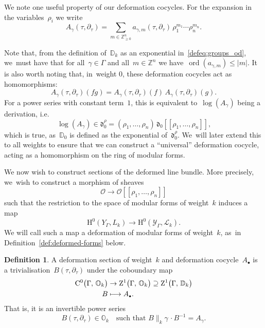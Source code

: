 \documentclass[10pt,a4paper]{article}
\numberwithin{equation}{section}
\let\oldbullet\bullet
\renewcommand{\bullet}{{\scriptscriptstyle\oldbullet}}
\theoremstyle{plain}
\theoremstyle{definition}
\newtheorem{definition}[theoremcounter]{Definition}
\newcommand{\tx}{\text}
\newcommand{\bbD}{\ensuremath{\mathbb{D}}}
\newcommand{\bbO}{\ensuremath{\mathbb{O}}}
\newcommand{\bbZ}{\ensuremath{\mathbb{Z}}}
\newcommand{\cL}{\ensuremath{\mathcal{L}}}
\newcommand{\cO}{\ensuremath{\mathcal{O}}}
\newcommand{\cY}{\ensuremath{\mathcal{Y}}}
\newcommand{\frakd}{\ensuremath{\mathfrak{d}}}
\newcommand{\rmC}{\ensuremath{\mathrm{C}}}
\newcommand{\rmH}{\ensuremath{\mathrm{H}}}
\newcommand{\rmZ}{\ensuremath{\mathrm{Z}}}
\newcommand{\llbrkt}{[\![}
\newcommand{\rrbrkt}{]\!]}
\let\Ga\Gamma
\let\ga\gamma
\newcommand{\ord}{\operatorname{ord}}
\newcommand\mto{\mathchoice{\longmapsto}{\mapsto}{\mapsto}{\mapsto}}
\begin{document}
We note one useful property of our deformation cocycles. For the expansion in the variables~$\rho_i$ we write
\begin{equation}
\label{eq:deformation_cocyle_coefficients}
A_\ga(\tau, \partial_\tau)
=
\sum_{m \in \bbZ_{\geq 0}^n}
a_{\ga,m}(\tau, \partial_\tau)\,
\rho_1^{m_1} \cdots \rho_n^{m_n}
\tx{.}
\end{equation}

Note that, from the definition of~$\bbD_k$ as an exponential in~\eqref{defeq:groups_od}, we~must have that for all~$\ga \in \Ga$ and all~$m \in \bbZ^n$ we have~$\ord(a_{\ga,m}) \le |m|$. It is also worth noting that, in~weight 0, these deformation cocycles act as homomorphisms:
\begin{equation*}
A_\ga(\tau,\partial_\tau)(fg) = A_\ga(\tau,\partial_\tau)(f)\, A_\ga(\tau,\partial_\tau)(g)
\tx{.}
\end{equation*}
For a power series with constant term~$1$, this is equivalent to~$\log(A_\ga)$ being a derivation, i.e.
\begin{equation*}
\log(A_\ga) \in \frakd_0^\rho
=
(\rho_1,\ldots,\rho_n)\,
\frakd_0\llbrkt \rho_1,\ldots,\rho_n\rrbrkt
\tx{,}
\end{equation*}
which is true, as~$\bbD_0$ is defined as the exponential of~$\frakd_0^\rho$. We~will later extend this to all weights to ensure that we can construct a ``universal'' deformation cocycle, acting as a homomorphism on the ring of modular forms.

We now wish to construct sections of the deformed line bundle. More precisely, we~wish to construct a morphism of sheaves
\begin{equation*}\cO\to \cO \llbrkt \rho_1,\ldots,\rho_n\rrbrkt\end{equation*}
such that the restriction to the space of modular forms of weight~$k$ induces a map
\begin{equation*}\rmH^0(Y_\Ga,L_k) \to \rmH^0(\cY_\Ga,\cL_k).\end{equation*}
We will call such a map a deformation of modular forms of weight~$k$, as~in Definition~\ref{def:deformed-forms} below.

\begin{definition}
\label{def:algebraic_deformation_section}
A deformation section of weight~$k$ and deformation cocycle~$A_\bullet$ is
a trivialisation~$B(\tau, \partial_\tau)$ under the coboundary map
\begin{align*}
\rmC^0\bigl(\Ga,\, \bbO_k \bigr)
&
\to{}
\rmZ^1\bigl(\Ga,\, \bbO_k \bigr)
\supseteq
\rmZ^1\bigl(\Ga,\, \bbD_k \bigr)
\\
B
&\mto
A_\bullet
\tx{.}
\end{align*}
That is, it is an invertible power series
\begin{equation*}
B(\tau,\partial_\tau) \in \bbO_k
\quad\tx{such that\ }
B\big\|_k\gamma\,\cdot B^{-1}
=
A_\ga
\tx{.}
\end{equation*}
\end{definition}
\end{document}
